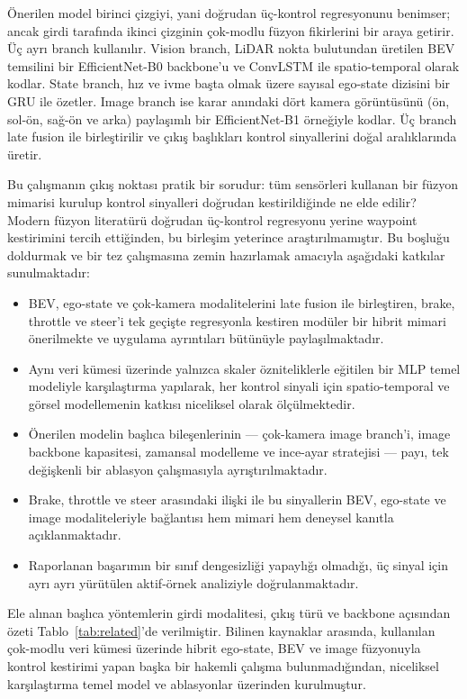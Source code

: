 \documentclass[conference]{IEEEtran}
\begin{document}
Önerilen model birinci çizgiyi, yani doğrudan üç-kontrol regresyonunu benimser; ancak girdi tarafında ikinci çizginin çok-modlu füzyon fikirlerini bir araya getirir. Üç ayrı branch kullanılır. Vision branch, LiDAR nokta bulutundan üretilen BEV temsilini bir EfficientNet-B0 \cite{Tan19EfficientNet} backbone'u ve ConvLSTM \cite{Shi15ConvLSTM} ile spatio-temporal olarak kodlar. State branch, hız ve ivme başta olmak üzere sayısal ego-state dizisini bir GRU \cite{Cho14GRU} ile özetler. Image branch ise karar anındaki dört kamera görüntüsünü (ön, sol-ön, sağ-ön ve arka) paylaşımlı bir EfficientNet-B1 örneğiyle kodlar. Üç branch late fusion ile birleştirilir ve çıkış başlıkları kontrol sinyallerini doğal aralıklarında üretir.

Bu çalışmanın çıkış noktası pratik bir sorudur: tüm sensörleri kullanan bir füzyon mimarisi kurulup kontrol sinyalleri doğrudan kestirildiğinde ne elde edilir? Modern füzyon literatürü doğrudan üç-kontrol regresyonu yerine waypoint kestirimini tercih ettiğinden, bu birleşim yeterince araştırılmamıştır. Bu boşluğu doldurmak ve bir tez çalışmasına zemin hazırlamak amacıyla aşağıdaki katkılar sunulmaktadır:

\begin{itemize}
\item BEV, ego-state ve çok-kamera modalitelerini late fusion ile birleştiren, brake, throttle ve steer'i tek geçişte regresyonla kestiren modüler bir hibrit mimari önerilmekte ve uygulama ayrıntıları bütünüyle paylaşılmaktadır.
\item Aynı veri kümesi üzerinde yalnızca skaler özniteliklerle eğitilen bir MLP temel modeliyle karşılaştırma yapılarak, her kontrol sinyali için spatio-temporal ve görsel modellemenin katkısı niceliksel olarak ölçülmektedir.
\item Önerilen modelin başlıca bileşenlerinin --- çok-kamera image branch'i, image backbone kapasitesi, zamansal modelleme ve ince-ayar stratejisi --- payı, tek değişkenli bir ablasyon çalışmasıyla ayrıştırılmaktadır.
\item Brake, throttle ve steer arasındaki ilişki ile bu sinyallerin BEV, ego-state ve image modaliteleriyle bağlantısı hem mimari hem deneysel kanıtla açıklanmaktadır.
\item Raporlanan başarımın bir sınıf dengesizliği yapaylığı olmadığı, üç sinyal için ayrı ayrı yürütülen aktif-örnek analiziyle doğrulanmaktadır.
\end{itemize}

Ele alınan başlıca yöntemlerin girdi modalitesi, çıkış türü ve backbone açısından özeti Tablo~\ref{tab:related}'de verilmiştir. Bilinen kaynaklar arasında, kullanılan çok-modlu veri kümesi \cite{immanuel_peter_2025} üzerinde hibrit ego-state, BEV ve image füzyonuyla kontrol kestirimi yapan başka bir hakemli çalışma bulunmadığından, niceliksel karşılaştırma temel model ve ablasyonlar üzerinden kurulmuştur.
\end{document}
